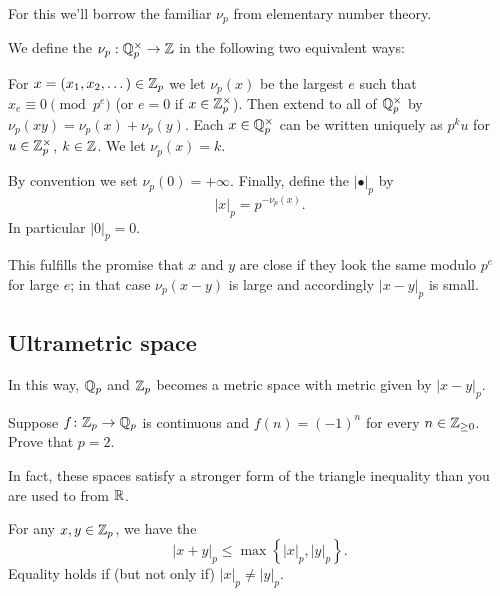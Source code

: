 For this we'll borrow the familiar $\nu_p$ from elementary number theory.
\begin{definition}
	We define the  $\nu_p : \mathbb Q_p^\times \to \mathbb Z$
	in the following two equivalent ways:
	\begin{itemize}
		\ii For $x = (x_1, x_2, \dots) \in \mathbb Z_p$ we let
		$\nu_p(x)$ be the largest $e$ such that
		$x_e \equiv 0 \pmod{p^e}$ (or $e=0$ if $x \in \mathbb Z_p^\times$).
		Then extend to all of $\mathbb Q_p^\times$
		by $\nu_p(xy) = \nu_p(x) + \nu_p(y)$.
		\ii Each $x \in \mathbb Q_p^\times$ can be written
		uniquely as $p^k u$ for $u \in \mathbb Z_p^\times$, $k \in \mathbb Z$.
		We let $\nu_p(x) = k$.
	\end{itemize}
	By convention we set $\nu_p(0) = +\infty$.
	Finally, define the 
	$\left\lvert \bullet \right\rvert_p$ by
	\[ \left\lvert x \right\rvert_p = p^{-\nu_p(x)}. \]
	In particular $\left\lvert 0 \right\rvert_p = 0$.
\end{definition}
This fulfills the promise that $x$ and $y$ are close
if they look the same modulo $p^e$ for large $e$;
in that case $\nu_p(x-y)$ is large
and accordingly $\left\lvert x-y \right\rvert_p$ is small.

\subsection{Ultrametric space}
In this way, $\mathbb Q_p$ and $\mathbb Z_p$ becomes a metric space
with metric given by $\left\lvert x-y \right\rvert_p$.

\begin{exercise}
	\label{exer:alternating}
	Suppose $f \colon \mathbb Z_p \to \mathbb Q_p$ is continuous
	and $f(n) = (-1)^n$ for every $n \in \mathbb Z_{\ge 0}$.
	Prove that $p = 2$.
\end{exercise}

In fact, these spaces satisfy a stronger
form of the triangle inequality than you are used to from $\mathbb R$.
\begin{proposition}
	For any $x,y \in \mathbb Z_p$, we have the 
	\[ \left\lvert x+y \right\rvert_p
		\le \max \left\{ \left\lvert x \right\rvert_p,
		\left\lvert y \right\rvert_p \right\}.
	\]
	Equality holds if (but not only if)
	$\left\lvert x \right\rvert_p \neq \left\lvert y \right\rvert_p$.
\end{proposition}

